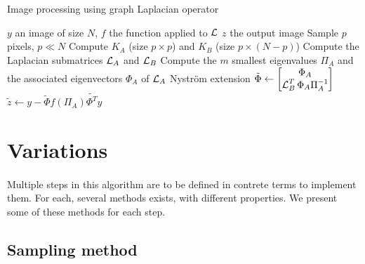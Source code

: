 \begin{algorithm}[H]
 \caption{Image processing using graph Laplacian operator}
 \begin{algorithmic}
  \REQUIRE \(y\) an image of size \(N\), \(f\) the function applied to \(\operatorname{\mathcal{L}}\)
  \ENSURE \(z\) the output image
  \STATE {}
  \STATE Sample \(p\) pixels, \(p \ll N\)
  \STATE {}
  \STATE Compute \(K_A\) (size \(p \times p\)) and \(K_B\) (size \(p \times (N-p)\))
  \STATE Compute the Laplacian submatrices \(\operatorname{\mathcal{L}}_A\) and \(\operatorname{\mathcal{L}}_B\)
  \STATE {}
  \STATE Compute the \(m\) smallest eigenvalues \(\Pi_A\) and the associated eigenvectors \(\Phi_A\) of \(\operatorname{\mathcal{L}}_A\)
  \STATE Nystr\"om extension \(\tilde{\Phi} \leftarrow \begin{bmatrix} \Phi_A \\ \operatorname{\mathcal{L}}_B^T \Phi_A \Pi_A^{-1} \end{bmatrix}\)
  \STATE {}
  \STATE \(\tilde{z} \leftarrow y - \tilde{\Phi} f(\Pi_A) \tilde{\Phi^T} y\)
 \end{algorithmic}
\end{algorithm}

\section{Variations}

\paragraph{}
Multiple steps in this algorithm are to be defined in contrete terms to implement them.
For each, several methods exists, with different properties.
We present some of these methods for each step.

\subsection{Sampling method}

